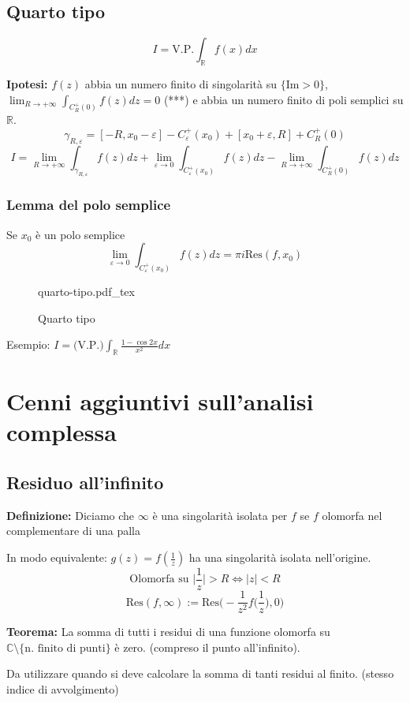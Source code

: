 \documentclass[a4paper]{article}
\newcommand{\incfig}[1]{%
	\def\svgwidth{\columnwidth}
	{#1.pdf_tex}
}
\newcommand{\R}{\mathbb{R}}
\newcommand{\C}{\mathbb{C}}
\begin{document}
\subsection{Quarto tipo}
\begin{tcolorbox}
\[I=\text{V.P.}\int_{\R}^{} f(x)dx\]	
\end{tcolorbox}
\textbf{Ipotesi:} $f(z)$ abbia un numero finito di singolarità su $\{\text{Im}>0\} $, \\$\lim_{R \to +\infty} \int_{C_R^+(0)}^{} f(z)dz=0$ (***) e abbia un numero finito di poli semplici su $\R$.
\[\gamma_{R,\varepsilon}=[-R,x_0-\varepsilon]-C_\varepsilon^+(x_0)+[x_0+\varepsilon,R]+C_R^+(0)\]
\[I=\lim_{R \to +\infty} \int_{\gamma_{R,\varepsilon}}f(z)dz + \lim_{\varepsilon \to 0} \int_{C_\varepsilon^+(x_0)}^{} f(z)dz-\lim_{R \to +\infty} \int_{C_R^+(0)}{f(z)dz}\]
\subsubsection{Lemma del polo semplice}
Se $x_0$ è un polo semplice
\[\lim_{\varepsilon \to 0} \int_{C_\varepsilon^+(x_0)}^{} f(z)dz=\pi i \text{Res}(f,x_0)\] 
\begin{figure}[ht]
    \centering
    \incfig{quarto-tipo}
    \caption{Quarto tipo}
    \label{fig:quarto-tipo}
\end{figure}
Esempio: $I=\text{(V.P.)}\int_{\R}^{} \frac{1-\cos 2x}{x^2}dx$
\section{Cenni aggiuntivi sull'analisi complessa}
\subsection{Residuo all'infinito}
\begin{tcolorbox}
	\textbf{Definizione:} Diciamo che $\infty$ è una singolarità isolata per $f$ se $f$ olomorfa nel complementare di una palla
\end{tcolorbox}
In modo equivalente: $g(z)=f(\frac{1}{z})$ ha una singolarità isolata nell'origine.
\[\text{Olomorfa su }\bigg|\frac{1}{z}\bigg|>R\iff |z|<R\]
\[\text{Res}(f,\infty):=\text{Res}\bigg(-\frac{1}{z^2}f\bigg(\frac{1}{z}\bigg),0\bigg)\]
\begin{tcolorbox}
	\textbf{Teorema:} La somma di tutti i residui di una funzione olomorfa su $\C\setminus \{\text{n. finito di punti}\} $ è zero. (compreso il punto all'infinito).
\end{tcolorbox}
Da utilizzare quando si deve calcolare la somma di tanti residui al finito. (stesso indice di avvolgimento)
\end{document}

